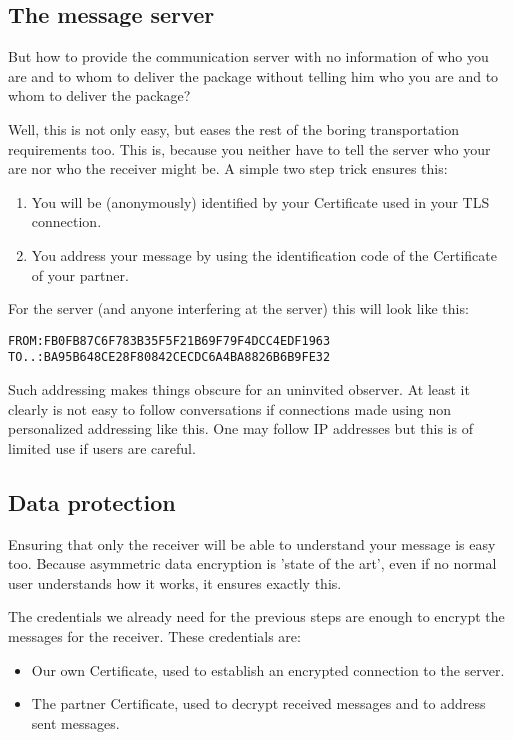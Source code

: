 \documentclass[twoside,a4paper,english,12pt,authoryear,openright]{book}
\begin{document}
\subsection{The message server}

But how to provide the communication server with no information of who you are and to whom to deliver the package without telling him who you are and to whom to deliver the package?

Well, this is not only easy, but eases the rest of the boring transportation requirements too. This is, because you neither have to tell the server who your are nor who the receiver might be. A simple two step trick ensures this:

\begin{enumerate}
\item{You will be (anonymously) identified by your Certificate used in your TLS connection.}
\item{You address your message by using the identification code of the Certificate of your partner.}
\end{enumerate}

For the server (and anyone interfering at the server) this will look like this:

\begin{lstlisting}
FROM:FB0FB87C6F783B35F5F21B69F79F4DCC4EDF1963
TO..:BA95B648CE28F80842CECDC6A4BA8826B6B9FE32
\end{lstlisting}

Such addressing makes things obscure for an uninvited observer. At least it clearly is not easy to follow conversations if connections made using non personalized addressing like this. One may follow IP addresses but this is of limited use if users are careful.


\subsection{Data protection}

Ensuring that only the receiver will be able to understand your message is easy too. Because asymmetric data encryption is 'state of the art', even if no normal user understands how it works, it ensures exactly this.

The credentials we already need for the previous steps are enough to encrypt the messages for the receiver. These credentials are:

\begin{itemize}
\item{Our own Certificate, used to establish an encrypted connection to the server.}
\item{The partner Certificate, used to decrypt received messages and to address sent messages.}
\end{itemize}
\end{document}
